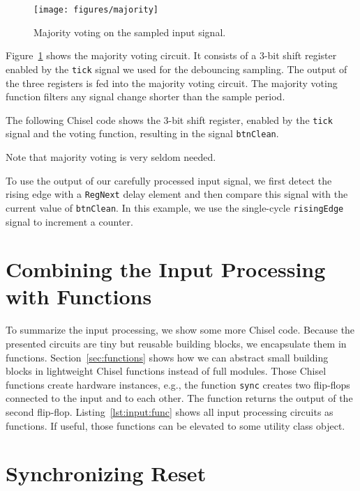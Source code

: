 \documentclass[%
    10pt,
    headinclude, footexclude,
    openright, %
    notitlepage,
    cleardoubleempty,
    headsepline,
    pointlessnumbers,
    bibtotoc, idxtotoc,
    ]{scrbook}
\newcommand{\code}[1]{{\lstinline[basicstyle=\small\ttfamily]{#1}}}
\begin{document}
\begin{figure}
  \centering
  \texttt{[image: figures/majority]}
  \caption{Majority voting on the sampled input signal.}
  \label{fig:majority}
\end{figure}

Figure~\ref{fig:majority} shows the majority voting circuit.
It consists of a 3-bit shift register enabled by the \code{tick} signal
we used for the debouncing sampling. The output of the three registers
is fed into the majority voting circuit. The majority voting function filters
any signal change shorter than the sample period.

The following Chisel code shows the 3-bit shift register, enabled by the
\code{tick} signal and the voting function, resulting in the signal \code{btnClean}.

Note that majority voting is very seldom needed.


To use the output of our carefully processed input signal, we first detect
the rising edge with a \code{RegNext} delay element and then compare this
signal with the current value of \code{btnClean}. In this example, we use
the single-cycle \code{risingEdge} signal to increment a counter.



\section{Combining the Input Processing with Functions}

To summarize the input processing, we show some more Chisel code.
Because the presented circuits are tiny but reusable building blocks, we encapsulate
them in functions. Section~\ref{sec:functions} shows how we can abstract
small building blocks in lightweight Chisel functions instead of full modules.
Those Chisel functions create hardware instances, e.g., the function
\code{sync} creates two flip-flops connected to the input and to each other.
The function returns the output of the second flip-flop.
Listing~\ref{lst:input:func} shows all input processing circuits as functions.
If useful, those functions can be elevated to some utility class object.


\section{Synchronizing Reset}
\end{document}
